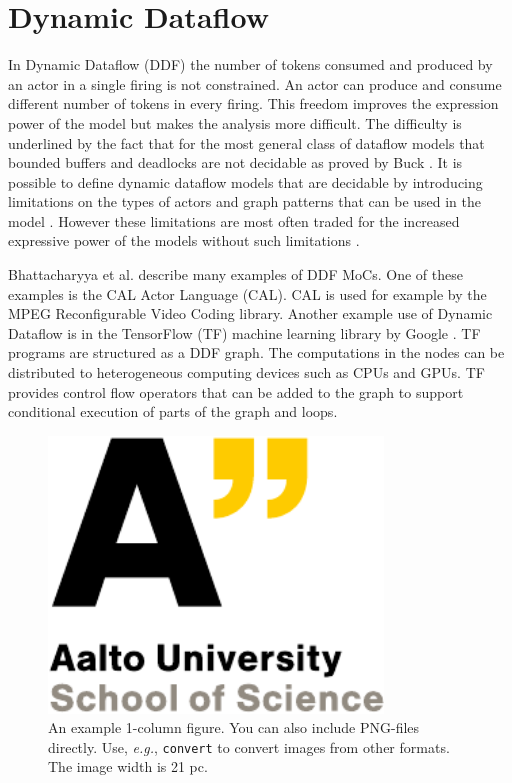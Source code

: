 \documentclass[conference,a4paper]{IEEEtran}
\begin{document}
\section{Dynamic Dataflow}
In Dynamic Dataflow (DDF) the number of tokens consumed and produced by an actor
in a single firing is not constrained. An actor can produce and consume
different number of tokens in every firing. This freedom improves the expression
power of the model but makes the analysis more difficult. The difficulty is
underlined by the fact that for the most general class of dataflow models that
bounded buffers and deadlocks are not decidable as proved by Buck
\cite{buck1993scheduling}. It is possible to define dynamic dataflow models that
are decidable by introducing limitations on the types of actors and graph
patterns that can be used in the model \cite{bhattacharyya2013handbook,
gao1992well}. However these limitations are most often traded for the increased
expressive power of the models without such limitations
\cite{bhattacharyya2013handbook}.

Bhattacharyya et al. \cite{bhattacharyya2013handbook} describe many examples of
DDF MoCs. One of these examples is the CAL Actor Language (CAL). CAL is used for
example by the MPEG Reconfigurable Video Coding library. Another example use of
Dynamic Dataflow is in the TensorFlow (TF) machine learning library by Google
\cite{tensorflow2015-whitepaper}. TF programs are structured as a DDF graph. The
computations in the nodes can be distributed to heterogeneous computing devices
such as CPUs and GPUs. TF provides control flow operators that can be added to
the graph to support conditional execution of parts of the graph and loops.

\begin{figure}[!t]
\centering
\includegraphics[width=21pc]{Aalto_EN_SCI_21_RGB_y2.pdf}
\caption{An example 1-column figure. You can also include PNG-files
  directly. Use, \emph{e.g.}, \texttt{convert} to convert images from
  other formats. The image width is 21 pc.}
\label{fig:example-1col}
\end{figure}
\end{document}
